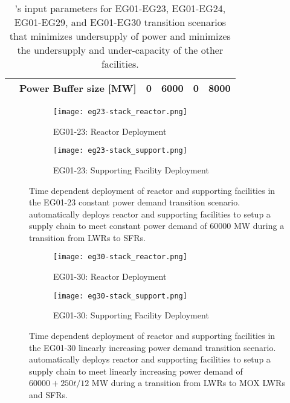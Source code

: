 \begin{table}[]
{\begin{tabular}{l|l|c|l|l|l}
											  & Power Buffer size [MW]                                                   & 0 & 6000 & 0 & 8000 \\ \hline
	\end{tabular}%
	}
	\caption{\deploy's input parameters for EG01-EG23, EG01-EG24, EG01-EG29, and 
	EG01-EG30 transition scenarios
	that minimizes undersupply of power and minimizes 
	the undersupply and under-capacity of the other facilities. }
	\label{tab:bestinputs}
	\end{table}

\begin{figure}[]
	\centering
	\begin{subfigure}[t]{1.2\textwidth}
		\centering
		\texttt{[image: eg23-stack\_reactor.png]} 
		\caption{EG01-23: Reactor Deployment}
		\label{fig:23reactor}
	\end{subfigure}
	\vspace{1cm}
	\begin{subfigure}[t]{1.2\textwidth}
		\centering
		\texttt{[image: eg23-stack\_support.png]} 
		\caption{EG01-23: Supporting Facility Deployment}
		\label{fig:23support}
	\end{subfigure}
	\hfill
	\caption{Time dependent deployment of reactor and supporting facilities in 
	the EG01-23 constant power demand transition scenario. 
	\deploy automatically deploys reactor and supporting facilities 
	to setup a supply chain to meet constant power demand of $60000$ MW
	during a transition from \glspl{LWR} to \glspl{SFR}. }
	\label{fig:23stack}
\end{figure}

\begin{figure}[]
	\centering
	\begin{subfigure}[t]{1.2\textwidth}
		\centering
		\texttt{[image: eg30-stack\_reactor.png]} 
		\caption{EG01-30: Reactor Deployment}
		\label{fig:30reactor}
	\end{subfigure}
	\vspace{1cm}
	\begin{subfigure}[t]{1.2\textwidth}
		\centering
		\texttt{[image: eg30-stack\_support.png]} 
		\caption{EG01-30: Supporting Facility Deployment}
		\label{fig:30support}
	\end{subfigure}
	\hfill
	\caption{Time dependent deployment of reactor and supporting facilities in 
	the EG01-30 linearly increasing power demand transition scenario. 
	\deploy automatically deploys reactor and supporting facilities 
	to setup a supply chain to meet linearly increasing power demand of $60000 + 250t/12$ MW
	during a transition from \glspl{LWR} to MOX LWRs and \glspl{SFR}. }
	\label{fig:30stack}
\end{figure}

